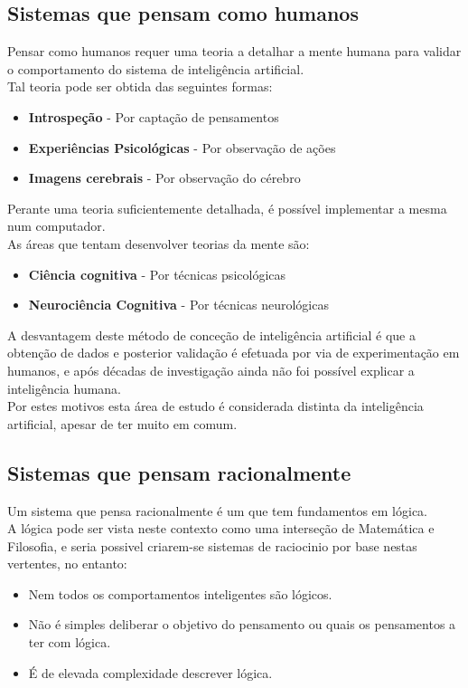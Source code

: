 \documentclass[]{report}
\begin{document}
\subsection{Sistemas que pensam como humanos}
Pensar como humanos requer uma teoria a detalhar a mente humana para validar o comportamento do sistema de inteligência artificial.\\
Tal teoria pode ser obtida das seguintes formas:
\begin{itemize}
\item \textbf{Introspeção} - Por captação de pensamentos
\item \textbf{Experiências Psicológicas} - Por observação de ações
\item \textbf{Imagens cerebrais} - Por observação do cérebro
\end{itemize}
Perante uma teoria suficientemente detalhada, é possível implementar a mesma num computador.\\
As áreas que tentam desenvolver teorias da mente são:
\begin{itemize}
\item \textbf{Ciência cognitiva} - Por técnicas psicológicas
\item \textbf{Neurociência Cognitiva} - Por técnicas neurológicas
\end{itemize}
A desvantagem deste método de conceção de inteligência artificial é que a obtenção de dados e posterior validação é efetuada por via de experimentação em humanos, e após décadas de investigação ainda não foi possível explicar a inteligência humana.\\
Por estes motivos esta área de estudo é considerada distinta da inteligência artificial, apesar de ter muito em comum.
\subsection{Sistemas que pensam racionalmente}
Um sistema que pensa racionalmente é um que tem fundamentos em lógica.\\
A lógica pode ser vista neste contexto como uma interseção de Matemática e Filosofia, e seria possivel criarem-se sistemas de raciocinio por base nestas vertentes, no entanto:
\begin{itemize}
\item Nem todos os comportamentos inteligentes são lógicos.
\item Não é simples deliberar o objetivo do pensamento ou quais os pensamentos a ter com lógica.
\item É de elevada complexidade descrever lógica.
\end{itemize}
\end{document}
